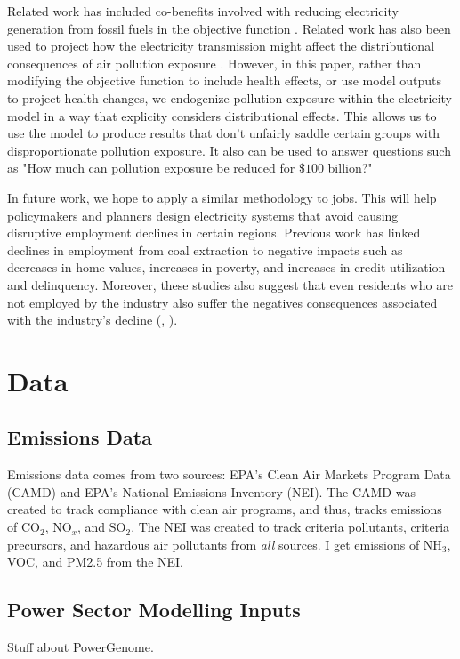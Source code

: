 \documentclass[a4paper]{article}
\theoremstyle{definition}
\theoremstyle{plain}
\begin{document}
Related work has included co-benefits involved with reducing electricity generation from fossil fuels in the objective function \citet{Sergi2020OptimizingBenefits}.
Related work has also been used to project how the electricity transmission might affect the distributional consequences of air pollution exposure \citep{Goforth2022AirStrategies}. However, in this paper, rather than modifying the objective function to include health effects, or use model outputs to project health changes, we endogenize pollution exposure within the electricity model in a way that explicity considers distributional effects.  This allows us to use the model to produce results that don't unfairly saddle certain groups with disproportionate pollution exposure.  It also can be used to answer questions such as "How much can pollution exposure be reduced for $\$100$ billion?" 

In future work, we hope to apply a similar methodology to jobs.  This will help policymakers and planners design electricity systems that avoid causing disruptive employment declines in certain regions. Previous work has linked declines in employment from  coal extraction to negative impacts such as decreases in home values, increases in poverty, and increases in credit utilization and delinquency. Moreover, these studies also suggest that even residents who are not employed by the industry also suffer the negatives consequences associated with the industry's decline (\citet{Kraynak2023TheCountry}, \citet{Blonz2023TheFuels}). 

\section{Data}
\subsection{Emissions Data}
Emissions data comes from two sources: EPA's Clean Air Markets Program Data (CAMD) and EPA's National Emissions Inventory (NEI).  The CAMD was created to track compliance with clean air programs, and thus, tracks emissions of CO$_2$, NO$_x$, and SO$_2$.  The NEI was created to track criteria pollutants, criteria precursors, and hazardous air pollutants from \textit{all} sources.  I get emissions of NH$_3$, VOC, and PM2.5 from the NEI. 

\subsection{Power Sector Modelling Inputs}
Stuff about PowerGenome.
\end{document}
